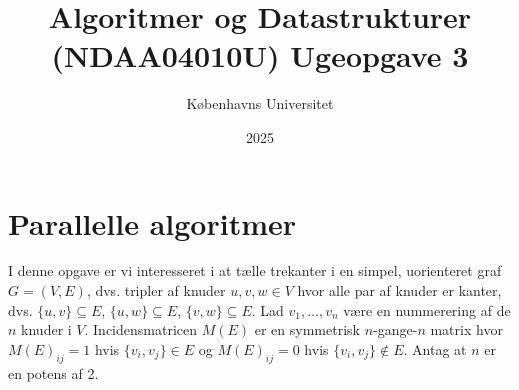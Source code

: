 \documentclass{article}
\title{Algoritmer og Datastrukturer (NDAA04010U) Ugeopgave 3}
\author{Københavns Universitet}
\date{2025}
\theoremstyle{definition}
\begin{document}
\maketitle

\section{Parallelle algoritmer}

I denne opgave er vi interesseret i at tælle trekanter i en simpel, uorienteret graf $G = (V, E)$, dvs. tripler af knuder $u, v, w \in V$ hvor alle par af knuder er kanter, dvs. $\{u, v\} \subseteq E$, $\{u, w\} \subseteq E$, $\{v, w\} \subseteq E$. Lad $v_1, \ldots, v_n$ være en nummerering af de $n$ knuder i $V$. Incidensmatricen $M(E)$ er en symmetrisk $n$-gange-$n$ matrix hvor $M(E)_{ij} = 1$ hvis $\{v_i, v_j\} \in E$ og $M(E)_{ij} = 0$ hvis $\{v_i, v_j\} \notin E$. Antag at $n$ er en potens af 2.
\end{document}
